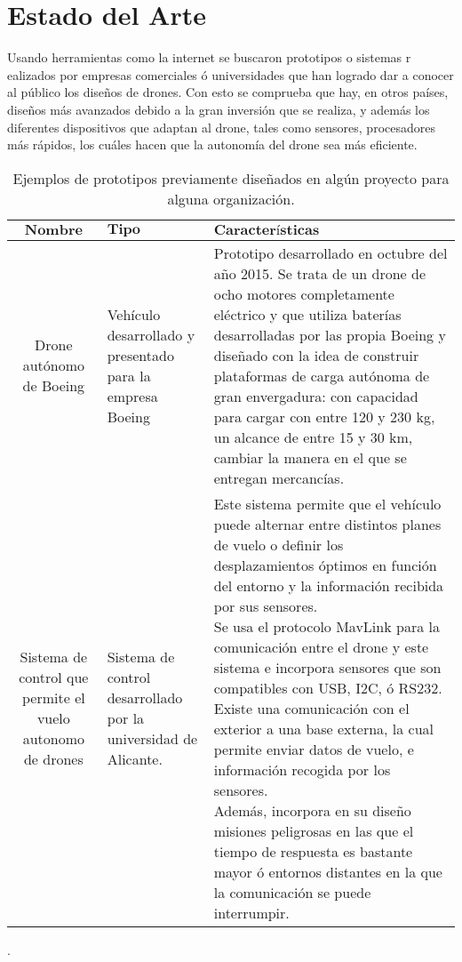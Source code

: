 %
%

\section{Estado del Arte}

Usando herramientas como la internet se buscaron prototipos o sistemas r
ealizados por empresas comerciales ó universidades que han logrado dar a conocer 
al público los diseños de drones. Con esto se comprueba que hay, en otros 
países, diseños más avanzados debido a la gran inversión que se realiza, y 
además los diferentes dispositivos que adaptan al drone, tales como sensores, 
procesadores más rápidos, los cuáles hacen que la autonomía del drone sea más 
eficiente.

\begin{table}[H]
	\centering 
	\caption{Ejemplos de prototipos previamente diseñados en algún proyecto 
		para alguna organización.}
	\begin{tabular*}{0.9\textwidth}{@{\extracolsep{\fill}} |c|l|l|}
		\hline
		$\textbf{Nombre}$ & $\textbf{Tipo}$ &
		$\textbf{Características}$
		\\\hline \hline
		\parbox[t]{4cm}{Drone autónomo de Boeing} &
		\parbox[t]{3cm}{Vehículo desarrollado y presentado para la 
		empresa Boeing } & 
		\parbox[t]{5.5cm}{Prototipo desarrollado en octubre del año 
		2015. Se trata de un drone de ocho motores completamente 
		eléctrico y que utiliza baterías desarrolladas por las propia 
		Boeing y diseñado con la idea de construir plataformas de carga 
		autónoma de gran envergadura: con capacidad para cargar con 
		entre 120 y 230 kg, un alcance de entre 15 y 30 km, cambiar la 
		manera en el que se entregan mercancías.
		} \\\hline
		\parbox[t]{4cm}{Sistema de control que permite el vuelo autonomo 
		de drones} &
		\parbox[t]{3cm}{Sistema de  control desarrollado por la 
		universidad de Alicante.
		} &
		\parbox[t]{5.5cm}{Este sistema permite que el vehículo puede 
		alternar entre distintos planes de vuelo o definir los 
		desplazamientos óptimos en función del entorno y la información 
		recibida por sus sensores.  \\
		Se usa el protocolo MavLink para la comunicación entre el drone 
		y este sistema e incorpora sensores que son compatibles con USB, 
		I2C, ó RS232.  \\
		Existe una comunicación con el exterior a una base externa, la 
		cual permite enviar datos de vuelo, e información recogida por 
		los sensores. \\
		Además, incorpora en su diseño misiones peligrosas en las que el 
		tiempo de respuesta es bastante mayor ó entornos distantes en la 
		que la comunicación se puede interrumpir.
		} \\\hline
	\end{tabular*}
\end{table}

.
\\ \\
